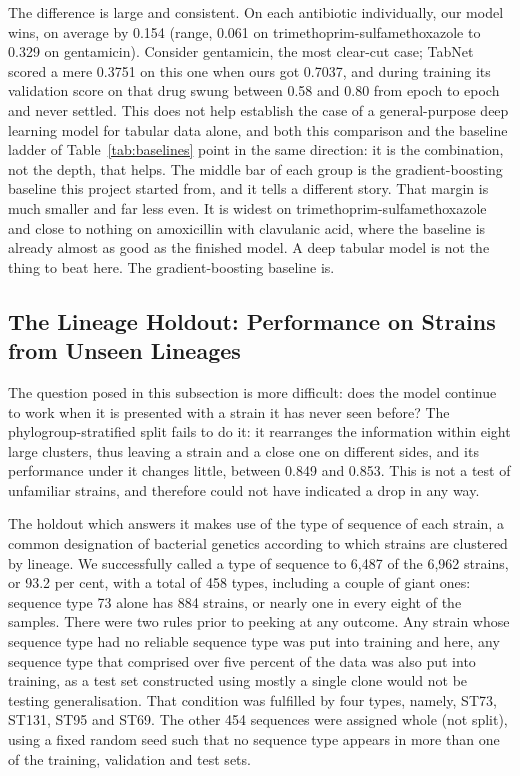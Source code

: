 The difference is large
and consistent. On each antibiotic individually, our model wins, on average by
0.154 (range, 0.061 on trimethoprim-sulfamethoxazole to 0.329 on gentamicin).
Consider gentamicin, the most clear-cut case; TabNet scored a mere 0.3751 on this
one when ours got 0.7037, and during training its validation score on that drug
swung between 0.58 and 0.80 from epoch to epoch and never settled. This does
not help establish the case of a general-purpose deep learning model for tabular
data alone, and both this comparison and the baseline ladder of
Table~\ref{tab:baselines} point in the same direction: it is the combination, not
the depth, that helps. The middle bar of each group is the gradient-boosting
baseline this project started from, and it tells a different story. That margin is
much smaller and far less even. It is widest on trimethoprim-sulfamethoxazole and
close to nothing on amoxicillin with clavulanic acid, where the baseline is
already almost as good as the finished model. A deep tabular model is not the
thing to beat here. The gradient-boosting baseline is.

\FloatBarrier
\subsection{The Lineage Holdout: Performance on Strains from Unseen Lineages}
\label{subsec:prevmatch}

The question posed in this subsection is more difficult: does the model
continue to work when it is presented with a strain it has never seen
before? The phylogroup-stratified split fails to do
it: it rearranges the information within eight large clusters, thus leaving a
strain and a close one on different sides, and its performance under it changes
little, between 0.849 and 0.853. This is not a test of unfamiliar strains, and
therefore could not have indicated a drop in any way.

The holdout which answers it makes use of the type of sequence of each strain, a
common designation of bacterial genetics according to which strains are clustered
by lineage. We successfully called a type of sequence to 6,487 of the 6,962
strains, or 93.2 per cent, with a total of 458 types, including a couple of giant
ones: sequence type 73 alone has 884 strains, or nearly one in every eight of the
samples. There were two rules prior to peeking at any outcome. Any strain whose
sequence type had no reliable sequence type was put into training and here, any
sequence type that comprised over five percent of the data was also put into
training, as a test set constructed using mostly a single clone would not be
testing generalisation. That condition was fulfilled by four types, namely, ST73,
ST131, ST95 and ST69. The other 454 sequences were assigned whole (not split),
using a fixed random seed such that no sequence type appears in more than one of
the training, validation and test sets.

